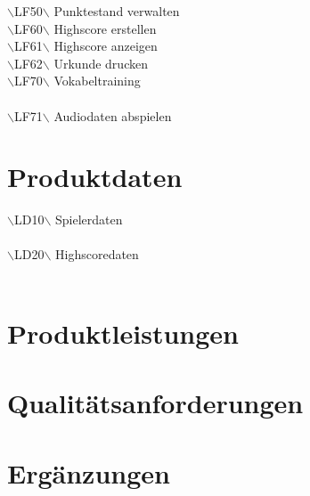 \noindent$\backslash$LF50$\backslash$ \hspace{15 mm}Punktestand verwalten\\

\noindent $\backslash$LF60$\backslash$ \hspace{15 mm}Highscore erstellen\\
$\backslash$LF61$\backslash$ \hspace{15 mm}Highscore anzeigen\\
$\backslash$LF62$\backslash$ \hspace{15 mm}Urkunde drucken\\

\noindent$\backslash$LF70$\backslash$ \hspace{15 mm} Vokabeltraining\\ \\

\noindent$\backslash$LF71$\backslash$ \hspace{15 mm}Audiodaten abspielen \\ 


\section{Produktdaten} %
$\backslash$LD10$\backslash$ \hspace{15 mm}Spielerdaten \\ \\
\noindent $\backslash$LD20$\backslash$ \hspace{15 mm}Highscoredaten \\ \\

\section{Produktleistungen} %

\section{Qualitätsanforderungen} %

\section{Ergänzungen} %


